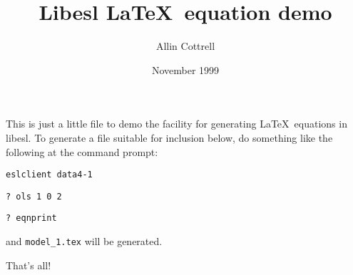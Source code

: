 \documentclass{article}
\begin{document}
\newcommand{\libesleqn}[1]{%
	\setlength{\tabcolsep}{2pt}
	\begin{center} 
	\vspace{8pt}
	
	\vspace{8pt}
	\end{center}
}

\newcommand{\libeslmodel}[1]{%
	\begin{center} 
	\vspace{8pt}
	
	\vspace{8pt}
	\end{center}
}

\newcommand{\tabspace}{\vspace{1em}}

\title{Libesl \LaTeX\ equation demo}
\author{Allin Cottrell}
\date{November 1999}
\maketitle

This is just a little file to demo the facility for generating
\LaTeX\ equations in libesl.  To generate a file suitable
for inclusion below, do something like the following at the
command prompt:

\vspace{6pt}

\verb+eslclient data4-1+

\verb+? ols 1 0 2+

\verb+? eqnprint+

\vspace{6pt}

\noindent and \texttt{model\_1.tex} will be generated.

\libesleqn{model_1}

That's all!
\end{document}
